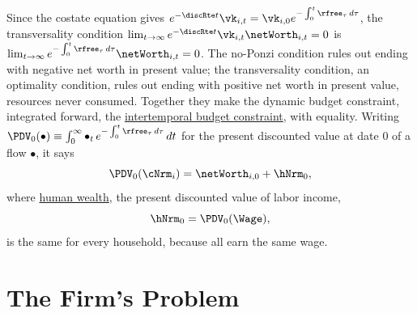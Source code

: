 \documentclass{econark}
\begin{document}
Since the costate equation gives $e^{-\discRte t}\vk_{i,t} = \vk_{i,0}e^{-\int_{0}^{t}\rfree_{\tau}\,d\tau}$, the transversality condition $\lim_{t \rightarrow \infty} e^{-\discRte t}\vk_{i,t}\netWorth_{i,t} = 0$ is $\lim_{t \rightarrow \infty} e^{-\int_{0}^{t}\rfree_{\tau}\,d\tau}\netWorth_{i,t} = 0$. The no-Ponzi condition rules out ending with negative net worth in present value; the transversality condition, an optimality condition, rules out ending with positive net worth in present value, resources never consumed. Together they make the dynamic budget constraint, integrated forward, the \href{https://intertemporal-choice.github.io/content/consumption/perfforesightcrra/\#eq-pfcrra-ibc}{intertemporal budget constraint}, with equality. Writing $\PDV_{0}(\bullet) \equiv \int_{0}^{\infty} \bullet_{t}\, e^{-\int_{0}^{t}\rfree_{\tau}\,d\tau}\,dt$ for the present discounted value at date 0 of a flow $\bullet$, it says
\begin{equation}
  \PDV_{0}(\cNrm_{i}) = \netWorth_{i,0} + \hNrm_{0}, \label{eq:DecRCK-ibc}
\end{equation}
where \href{https://intertemporal-choice.github.io/content/consumption/perfforesightcrra/\#eq-pfcrra-yfin}{human wealth}, the present discounted value of labor income,
\begin{equation}
  \hNrm_{0} = \PDV_{0}(\Wage), \label{eq:humwealth}
\end{equation}
is the same for every household, because all earn the same wage.

\section{The Firm's Problem}
\end{document}
